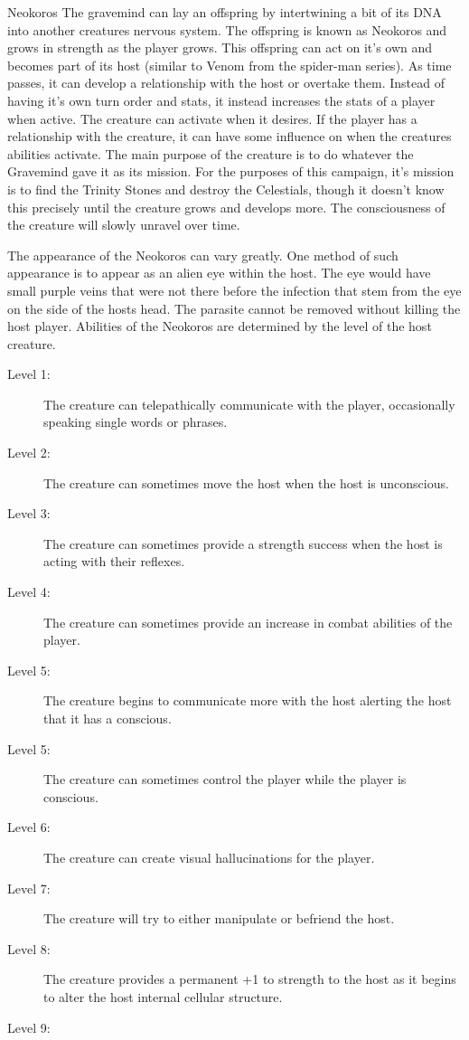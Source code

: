 \begin{commentbox}{Neokoros}
	The gravemind can lay an offspring by intertwining a bit of its DNA into another creatures nervous system. The offspring is known as Neokoros and grows in strength as the player grows. This offspring can act on it's own and becomes part of its host (similar to Venom from the spider-man series). As time passes, it can develop a relationship with the host or overtake them. Instead of having it's own turn order and stats, it instead increases the stats of a player when active. The creature can activate when it desires. If the player has a relationship with the creature, it can have some influence on when the creatures abilities activate. The main purpose of the creature is to do whatever the Gravemind gave it as its mission. For the purposes of this campaign, it's mission is to find the Trinity Stones and destroy the Celestials, though it doesn't know this precisely until the creature grows and develops more. The consciousness of the creature will slowly unravel over time.
	
	The appearance of the Neokoros can vary greatly. One method of such appearance is to appear as an alien eye within the host. The eye would have small purple veins that were not there before the infection that stem from the eye on the side of the hosts head. The parasite cannot be removed without killing the host player. Abilities of the Neokoros are determined by the level of the host creature.
	
	\begin{description}
		\item[Level 1:] The creature can telepathically communicate with the player, occasionally speaking single words or phrases.
		\item[Level 2:] The creature can sometimes move the host when the host is unconscious.
		\item[Level 3:] The creature can sometimes provide a strength success when the host is acting with their reflexes. 
		\item[Level 4:] The creature can sometimes provide an increase in combat abilities of the player.
		\item[Level 5:] The creature begins to communicate more with the host alerting the host that it has a conscious.
		\item[Level 5:] The creature can sometimes control the player while the player is conscious.
		\item[Level 6:] The creature can create visual hallucinations for the player.
		\item[Level 7:] The creature will try to either manipulate or befriend the host.
		\item[Level 8:] The creature provides a permanent +1 to strength to the host as it begins to alter the host internal cellular structure.
		\item[Level 9:] 
 	\end{description}
\end{commentbox}
